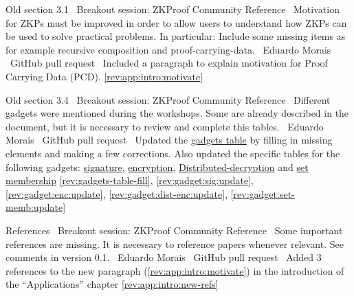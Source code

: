 Old section 3.1
\newcol \ccontext\ Breakout session: ZKProof Community Reference
				\propContrib\ Motivation for ZKPs must be improved in order to allow users to understand how ZKPs can be used to solve practical problems. In particular: Include some missing items as for example recursive composition and proof-carrying-data.
\newcol {}
\newcol \contributors\ Eduardo Morais
				\submit\ GitHub pull request
				\Chan\ Included a paragraph to explain motivation for Proof Carrying Data (PCD).	
\newcol \ref{rev:app:intro:motivate}
\rowendL
\myendIssue



Old section 3.4
\newcol \ccontext\ Breakout session: ZKProof Community Reference
				\propContrib\ Different gadgets were mentioned during the workshops. Some are already described in the document, but it is necessary to review and complete this tables.
\newcol {}
\newcol \contributors\ Eduardo Morais
				\submit\ GitHub pull request
				\Chan\ Updated the \hyperref[tab:list-gadgets]{gadgets table} by filling in missing elements and making a few corrections.
				Also updated the specific tables for the following gadgets: \hyperref[tab:gadget-signature]{signature}, \hyperref[tab:gadget-encryption]{encryption}, \hyperref[tab:gadget-dist-decryption]{Distributed-decryption} and \hyperref[tab:gadget-set-membership]{set membership}				
\newcol \ref{rev:gadgets-table-fill}, \ref{rev:gadget:sig:update}, \ref{rev:gadget:enc:update}, \ref{rev:gadget:dist-enc:update}, \ref{rev:gadget:set-memb:update}
\rowendL
\myendIssue


References
\newcol \ccontext\ Breakout session: ZKProof Community Reference
				\propContrib\ Some important references are missing. It is necessary to reference papers whenever relevant. See comments in version 0.1.
\newcol {}   %
\newcol \contributors\ Eduardo Morais
				\submit\ GitHub pull request
				\Chan\ Added 3 references to the new paragraph (\ref{rev:app:intro:motivate}) in the introduction of the ``Applications'' chapter
\newcol \ref{rev:app:intro:new-refs}
\rowendL
\myendIssue



